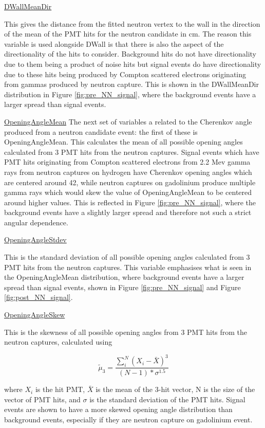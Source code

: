 \underline{DWallMeanDir}

This gives the distance from the fitted neutron vertex to the wall in the direction of the mean of the PMT hits for the neutron candidate in cm. The reason this variable is used alongside DWall is that there is also the aspect of the directionality of the hits to consider. Background hits do not have directionality due to them being a product of noise hits but signal events do have directionality due to these hits being produced by Compton scattered electrons originating from gammas produced by neutron capture. This is shown in the DWallMeanDir distribution in Figure \ref{fig:pre_NN_signal}, where the background events have a larger spread than signal events.

\underline{OpeningAngleMean}
The next set of variables a related to the Cherenkov angle produced from a neutron candidate event: the first of these is OpeningAngleMean.
This calculates the mean of all possible opening angles calculated from 3 PMT hits from the neutron captures. Signal events which have PMT hits originating from Compton scattered electrons from 2.2 Mev gamma rays from neutron captures on hydrogen have Cherenkov opening angles which are centered around 42\degree, while neutron captures on gadolinium produce multiple gamma rays which would skew the value of OpeningAngleMean to be centered around higher values. This is reflected in Figure \ref{fig:pre_NN_signal}, where the background events have a slightly larger spread and therefore not such a strict angular dependence.

\underline{OpeningAngleStdev}

This is the standard deviation of all possible opening angles calculated from 3 PMT hits from the neutron captures. This variable emphasises what is seen in the OpeningAngleMean distribution, where background events have a larger spread than signal events, shown in Figure \ref{fig:pre_NN_signal} and Figure \ref{fig:post_NN_signal}. 

\underline{OpeningAngleSkew}

This is the skewness of all possible opening angles from 3 PMT hits from the neutron captures, calculated using

\begin{equation}
    \tilde{\mu}_3=\frac{\sum_i^N\left(X_i-\bar{X}\right)^3}{(N-1) * \sigma^{1.5}}
\end{equation}

where $X_{i}$ is the hit PMT, $\bar{X}$ is the mean of the 3-hit vector, N is the size of the vector of PMT hits, and $\sigma$ is the standard deviation of the PMT hits. Signal events are shown to have a more skewed opening angle distribution than background events, especially if they are neutron capture on gadolinium event.

